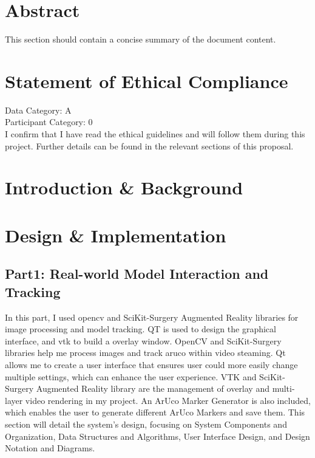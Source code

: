 \documentclass[12pt]{article}
\begin{document}
\section*{Abstract}
This section should contain a concise summary of the document content.
\section*{Statement of Ethical Compliance}
\begin{mdframed}
      \Large %
      Data Category: A \\
      Participant Category: 0 \\
      \normalsize %
      I confirm that I have read the ethical guidelines and will follow them during this project. Further details can be found in the relevant sections of this proposal.
\end{mdframed}
\newpage

\section{Introduction \& Background}



\section{Design \& Implementation}

\subsection{Part1: Real-world Model Interaction and Tracking}

In this part, I used \gls{opencv}\cite{opencv_library} and SciKit-Surgery Augmented Reality\cite{Thompson_SciKit-Surgery_Compact_Libraries_2020} libraries for image
processing and  model tracking. \gls{QT}\cite{QtWebsite} is used to design the graphical interface, and \gls{vtk}\cite{vtkBook} to build a overlay window\cite{6864541}. OpenCV and SciKit-Surgery libraries help me process images
and track \gls{aruco}\cite{1467495} within video steaming. Qt allows me to create a user interface that ensures  user could more easily change multiple settings, which can enhance the user experience.
VTK and SciKit-Surgery Augmented Reality library are the management of overlay and multi-layer video rendering in my project.
An ArUco Marker Generator is also included, which enables the user to generate different ArUco Markers and save them.
This section will detail the system's design, focusing on System Components and Organization, Data Structures and Algorithms,
User Interface Design, and Design Notation and Diagrams.
\end{document}
